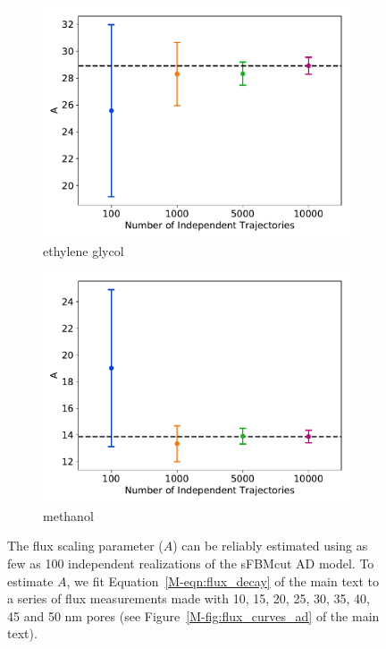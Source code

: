 \documentclass{article}
\begin{document}
\begin{figure}
\begin{subfigure}{0.45\textwidth}
  \includegraphics[width=\textwidth]{flux_curves_Asensitivity_GCL.pdf}
  \caption{ethylene glycol}\label{fig:Asensitivity_GCL}
  \end{subfigure}
  \begin{subfigure}{0.45\textwidth}
  \includegraphics[width=\textwidth]{flux_curves_Asensitivity_MET.pdf}
  \caption{methanol}\label{fig:Asensitivity_MET}
  \end{subfigure}
  \caption{The flux scaling parameter ($A$) can be reliably estimated using
  as few as 100 independent realizations of the sFBMcut AD model. To estimate
  $A$, we fit Equation~\ref{M-eqn:flux_decay} of the main text to a series of
  flux measurements made with 10, 15, 20, 25, 30, 35, 40, 45 and 50 nm pores (see
  Figure~\ref{M-fig:flux_curves_ad} of the main text).
  }\label{fig:A_sensitivity}
  \end{figure}
  
\end{document}
